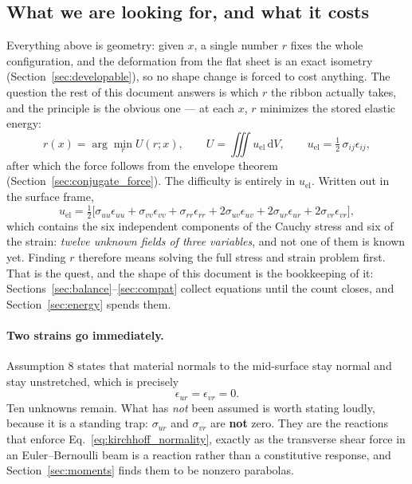 \documentclass[11pt]{article}
\begin{document}
\subsection{What we are looking for, and what it costs}\label{sec:quest}
Everything above is geometry: given $x$, a single number $r$ fixes the whole
configuration, and the deformation from the flat sheet is an exact isometry
(Section~\ref{sec:developable}), so no shape change is forced to cost anything.
The question the rest of this document answers is which $r$ the ribbon actually
takes, and the principle is the obvious one --- at each $x$, $r$ minimizes the
stored elastic energy:
\begin{equation}\label{eq:the_problem}
    \boxed{\;r(x) = \arg\min_{r} U(r;x),
    \qquad
    U = \iiint u_{\mathrm{el}}\,\mathrm dV,
    \qquad
    u_{\mathrm{el}} = \tfrac12\,\sigma_{ij}\epsilon_{ij},\;}
\end{equation}
after which the force follows from the envelope theorem
(Section~\ref{sec:conjugate_force}). The difficulty is entirely in
$u_{\mathrm{el}}$. Written out in the surface frame,
\begin{equation}\label{eq:u_el_general}
    u_{\mathrm{el}} = \tfrac12\Big[
      \sigma_{uu}\epsilon_{uu} + \sigma_{vv}\epsilon_{vv}
      + \sigma_{rr}\epsilon_{rr}
      + 2\sigma_{uv}\epsilon_{uv}
      + 2\sigma_{ur}\epsilon_{ur} + 2\sigma_{vr}\epsilon_{vr}\Big],
\end{equation}
which contains the six independent components of the Cauchy stress and six of
the strain: \emph{twelve unknown fields of three variables}, and not one of them
is known yet. Finding $r$ therefore means solving the full stress and strain
problem first. That is the quest, and the shape of this document is the
bookkeeping of it: Sections~\ref{sec:balance}--\ref{sec:compat} collect
equations until the count closes, and Section~\ref{sec:energy} spends them.

\paragraph{Two strains go immediately.} Assumption 8 states that material
normals to the mid-surface stay normal and stay unstretched, which is precisely
\begin{equation}\label{eq:kirchhoff_normality}
    \boxed{\;\epsilon_{ur} = \epsilon_{vr} = 0.\;}
\end{equation}
Ten unknowns remain. What has \emph{not} been assumed is worth stating loudly,
because it is a standing trap: $\sigma_{ur}$ and $\sigma_{vr}$ are
\textbf{not} zero. They are the reactions that enforce
Eq.~\eqref{eq:kirchhoff_normality}, exactly as the transverse shear force in an
Euler--Bernoulli beam is a reaction rather than a constitutive response, and
Section~\ref{sec:moments} finds them to be nonzero parabolas.
\end{document}
